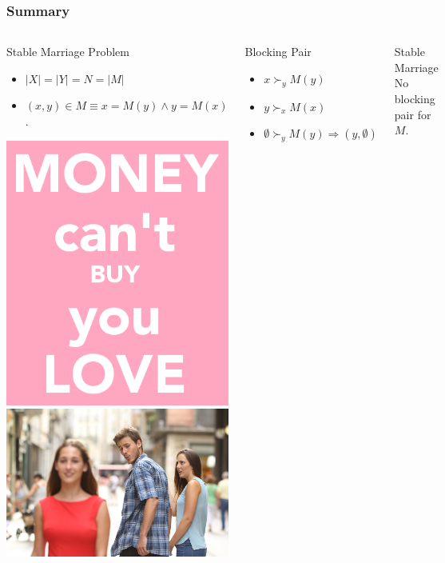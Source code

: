 \documentclass{beamer}
\begin{document}
\begin{frame}
\frametitle{Summary}

\begin{columns}[t]
\begin{block}{\small{Stable Marriage Problem}}
	\begin{itemize}
		\item \small{$|X| = |Y| = N = |M|$}
		\item \small{$(x, y)\in M \equiv x = M(y) \land y = M(x)$.}
	\end{itemize}
\includegraphics[width=.3\linewidth]{money_buy_love.png}
\includegraphics[width=.5\linewidth]{distracted_boyfriend.jpg}
\end{block}

\begin{block}{\small{Blocking Pair}}
	\begin{itemize}
			\item \small{$x \succ_y M(y)$}
			\item \small{$y \succ_x M(x)$}
			\item \small{$\emptyset \succ_y M(y) \Rightarrow (y, \emptyset)$}
	\end{itemize}
\end{block}
\begin{block}{\small{Stable Marriage}}
	 \small{No blocking pair for $M$.}
\end{block}


\end{columns}
\end{frame}
\end{document}
